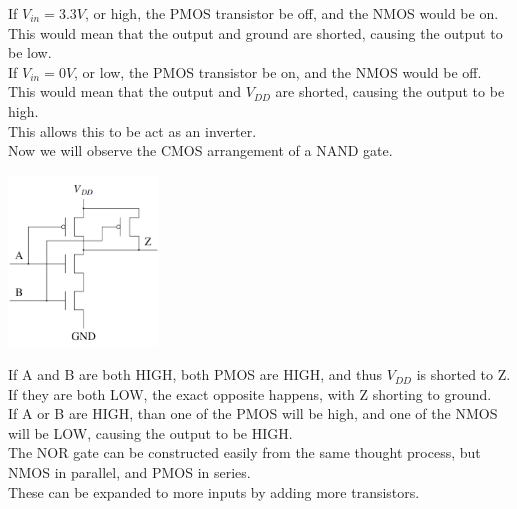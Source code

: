 \documentclass[nobib]{tufte-handout}
\begin{document}
If $V_{in} = 3.3V$, or high, the PMOS transistor be off, and the NMOS would be on. This would mean that the output and ground are shorted, causing the output to be low.\\
If $V_{in} = 0V$, or low, the PMOS transistor be on, and the NMOS would be off. This would mean that the output and $V_{DD}$ are shorted, causing the output to be high.\\
This allows this to be act as an inverter.\\
Now we will observe the CMOS arrangement of a NAND gate.
\begin{center}
    \includegraphics[width= 150px]{images/cmosnand.png}
\end{center}
If A and B are both HIGH, both PMOS are HIGH, and thus $V_{DD}$ is shorted to Z.\\
If they are both LOW, the exact opposite happens, with Z shorting to ground.\\
If A or B are HIGH, than one of the PMOS will be high, and one of the NMOS will be LOW, causing the output to be HIGH.\\
The NOR gate can be constructed easily from the same thought process, but NMOS in parallel, and PMOS in series.\\
These can be expanded to more inputs by adding more transistors.\\
\end{document}
